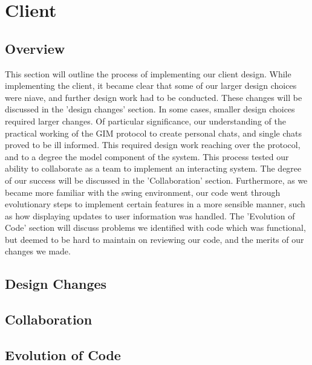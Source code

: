 \section{Client}

\subsection{Overview}

This section will outline the process of implementing our client design. While implementing the client, it became clear that some of our larger design choices were niave, and further design work had to be conducted. These changes will be discussed in the 'design changes' section. In some cases, smaller design choices required larger changes. Of particular significance, our understanding of the practical working of the GIM protocol to create personal chats, and single chats proved to be ill informed. This required design work reaching over the protocol, and to a degree the model component of the system. This process tested our ability to collaborate as a team to implement an interacting system. The degree of our success will be discussed in the 'Collaboration' section. Furthermore, as we became more familiar with the swing environment, our code went through evolutionary steps to implement certain features in a more sensible manner, such as how displaying updates to user information was handled. The 'Evolution of Code' section will discuss problems we identified with code which was functional, but deemed to be hard to maintain on reviewing our code, and the merits of our changes we made. 

\subsection{Design Changes}




\subsection{Collaboration}

\subsection{Evolution of Code}
